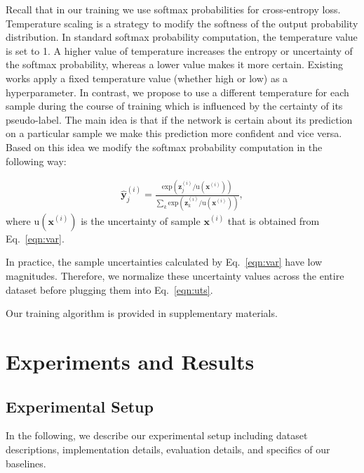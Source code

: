 \documentclass[runningheads]{eccv2022submission}
\begin{document}
Recall that in our training we use softmax probabilities for cross-entropy loss. Temperature scaling is a strategy to modify the softness of the output probability distribution. In standard softmax probability computation, the temperature value is set to 1. A higher value of temperature increases the entropy or uncertainty of the softmax probability, whereas a lower value makes it more certain. Existing works \cite{cao2022openworld,fini2021unified,chen2020simple,khosla2020supervised} apply a fixed temperature value (whether high or low) as a hyperparameter. In contrast, we propose to use a different temperature for each sample during the course of training which is influenced by the certainty of its pseudo-label. The main idea is that if the network is certain about its prediction on a particular sample we make this prediction more confident and vice versa. Based on this idea we modify the softmax probability computation in the following way:


\setlength{\abovedisplayskip}{-6pt}
\setlength{\belowdisplayskip}{2pt}
\setlength{\abovedisplayshortskip}{0pt}
\setlength{\belowdisplayshortskip}{0pt}
\begin{align}
\label{eqn:uts}
    \mathbf{\hat{y}}^{(i)}_j = \frac{ \mathrm{exp}(\mathbf{z}^{(i)}_j/\mathrm{u}(\mathbf{x}^{(i)}))}{\sum_k\mathrm{exp}(\mathbf{z}^{(i)}_k/\mathrm{u}(\mathbf{x}^{(i)}))},
\end{align}
where $\mathrm{u}(\mathbf{x}^{(i)})$ is the uncertainty of sample $\mathbf{x}^{(i)}$ that is obtained from Eq.~\ref{eqn:var}.


In practice, the sample uncertainties calculated by Eq.~\ref{eqn:var} have low magnitudes. Therefore, we normalize these uncertainty values across the entire dataset before plugging them into Eq.~\ref{eqn:uts}.   


Our training algorithm is provided in supplementary materials. 

\section{Experiments and Results}
\label{sec:exp}
\subsection{Experimental Setup}
In the following, we describe our experimental setup including dataset descriptions, implementation details, evaluation details, and specifics of our baselines. 
\end{document}
